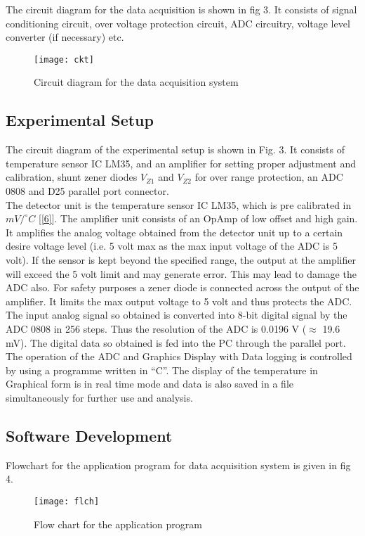 \documentclass[10pt,a4paper]{article}
\begin{document}
The circuit diagram for the data acquisition is shown in fig 3. It consists of signal conditioning circuit, over voltage protection circuit, ADC circuitry, voltage level converter (if necessary) etc.\\
\begin{figure}[!h]
\centering \texttt{[image: ckt]}
\centering \caption{Circuit diagram for the data acquisition system}
\end{figure}
\subsection{Experimental Setup}
The circuit diagram of the experimental setup is shown in
Fig. 3. It consists of temperature sensor IC LM35, and an amplifier for setting proper adjustment and calibration, shunt zener diodes $V_{Z1}$ and $V_{Z2}$ for over range protection, an ADC 0808 and D25 parallel port connector.\\

The detector unit is the temperature sensor IC LM35, which is pre calibrated in $mV/^{\circ}C$ [\ref{6}]. The amplifier unit consists of an OpAmp of low offset and high gain. It amplifies the analog voltage obtained from the detector unit up to a certain desire voltage level (i.e. 5 volt max as the max input voltage of the ADC is 5 volt). If the sensor is kept beyond the specified range, the output at the amplifier will exceed the 5 volt limit and may generate error. This may lead to damage the ADC also. For safety purposes a zener diode is connected across the output of the amplifier. It limits the max output voltage to 5 volt and thus protects the ADC.\\

The input analog signal so obtained is converted into 8-bit digital signal by the ADC 0808 in 256 steps. Thus the resolution of the ADC is 0.0196 V ($\approx$ 19.6 mV). The digital data so obtained is fed into the PC through the parallel port. The operation of the ADC and Graphics Display with Data logging is controlled by using a programme written in ``C''. The display of the temperature in Graphical form is in real time mode and data is also saved in a file simultaneously for further use and analysis.\\
\subsection{Software Development}
Flowchart for the application program for data acquisition system is given in fig 4.
\begin{figure}[!h]
\centering \texttt{[image: flch]}
\caption{Flow chart for the application  program}
\end{figure}
\end{document}

